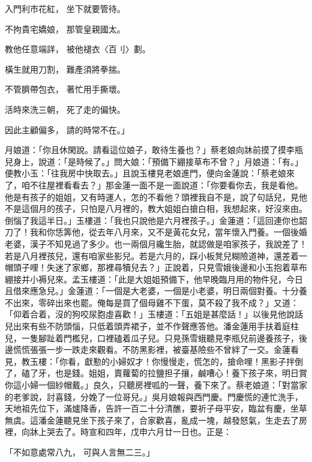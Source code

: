 \begin{showcontents}{}
入門利市花紅，  坐下就要管待。

不拘貴宅嬌娘，  那管皇親國太。

教他任意端詳，  被他褪衣〈百刂〉劃。

橫生就用刀割，  難產須將拳揣。

不管臍帶包衣，  著忙用手撕壞。

活時來洗三朝，  死了走的偏快。

因此主顧偏多，  請的時常不在。」

月娘道：「你且休閑說。請看這位娘子，敢待生養也？」蔡老娘向牀前摸了摸李瓶兒身上，說道：「是時候了。」問大娘：「預備下綳接草布不曾？」月娘道：「有。」便教小玉：「往我房中快取去。」且說玉樓見老娘進門，便向金蓮說：「蔡老娘來了，咱不往屋裡看看去？」那金蓮一面不是一面說道：「你要看你去，我是看他。他是有孩子的姐姐，又有時運人，怎的不看他？頭裡我自不是，說了句話兒，見他不是這個月的孩子，只怕是八月裡的，教大姐姐白搶白相，我想起來，好沒來由。倒惱了我這半日。」玉樓道：「我也只說他是六月裡孩子。」金蓮道：「這回連你也韶刀了！我和你恁筭他，從去年八月來，又不是黃花女兒，當年懷入門養。一個後婚老婆，漢子不知見過了多少。也一兩個月纔生胎，就認做是咱家孩子，我說差了！若是八月裡孩兒，還有咱家些影兒。若是六月的，踩小板凳兒糊險道神，還差着一帽頭子哩！失迷了家鄉，那裡尋犢兒去？」正說着，只見雪娥後邊和小玉抱着草布綳接并小褥兒來。孟玉樓道：「此是大姐姐預備下，他早晚臨月用的物件兒，今日且借來應急兒。」金蓮道：「一個是大老婆，一個是小老婆，明日兩個對養。十分養不出來，零碎出來也罷。俺每是買了個母雞不下蛋，莫不殺了我不成？」又道：「仰着合着，沒的狗咬尿胞虛喜歡！」玉樓道：「五姐是甚麼話！」以後見他說話兒出來有些不防頭惱，只低着頭弄裙子，並不作聲應答他。潘金蓮用手扶着庭柱兒，一隻腳趾着門檻兒，口裡磕着瓜子兒。只見孫雪蛾聽見李瓶兒前邊養孩子，後邊慌慌張張一步一跌走來觀看。不防黑影裡，被臺基險些不曾絆了一交。金蓮看見，教玉樓：「你看，獻懃的小婦奴才！你慢慢走，慌怎的，搶命哩！黑影子拌倒了，磕了牙，也是錢。姐姐，賣蘿蔔的拉鹽担子攘，鹹嘈心！養下孩子來，明日賞你這小婦一個紗帽戴。」良久，只聽房裡呱的一聲，養下來了。蔡老娘道：「對當家的老爹說，討喜錢，分娩了一位哥兒。」吳月娘報與西門慶。門慶慌的連忙洗手，天地祖先位下，滿爐降香，告許一百二十分清醮，要祈子母平安，臨盆有慶，坐草無虞。這潘金蓮聽見坐下孩子來了，合家歡喜，亂成一塊，越發怒氣，生走去了房裡，向牀上哭去了。時宣和四年，戊申六月廿一日也。正是：

「不如意處常八九，  可與人言無二三。」


\end{showcontents}
